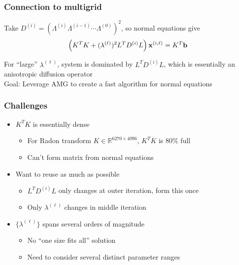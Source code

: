 \documentclass[12pt,t,xcolor=dvipsnames]{beamer}
\renewcommand{\vec}[1]{{\bf #1}}
\renewcommand{\vec}[1]{{\bf #1}}
\begin{document}
\begin{frame}
  \frametitle{Connection to multigrid}

  Take $D^{(i)} =
  \left(\Lambda^{(i)}\Lambda^{(i-1)}\cdots\Lambda^{(0)}\right)^2$, so normal
  equations give
\[
\left(K^TK + (\lambda^{(\ell)})^2L^TD^{(i)}L\right)\vec{x}^{(i,\ell)} = K^T\vec{b}
\]

For ``large'' $\lambda^{(\ell)}$, system is dominated by $L^TD^{(i)}L$,
which is essentially an anisotropic diffusion operator \\[18pt]

\alert{Goal:} Leverage AMG to create a fast algorithm for normal equations

\end{frame}

\begin{frame}
  \frametitle{Challenges}
  \begin{itemize}
  \item $K^TK$ is essentially dense
    \begin{itemize}
    \item For Radon transform $K\in\mathbb{R}^{6270\times4096}$,
      $K^TK$ is 80\% full
      \item Can't form matrix from normal equations
    \end{itemize}
  \item Want to reuse as much as possible
    \begin{itemize}
    \item $L^TD^{(i)}L$ only changes at outer iteration, form this
      once
    \item Only $\lambda^{(\ell)}$ changes in middle iteration
    \end{itemize}
  \item $\{\lambda^{(\ell)}\}$ spans several orders of magnitude
    \begin{itemize}
    \item No ``one size fits all'' solution
    \item Need to consider several distinct parameter ranges
    \end{itemize}
  \end{itemize}

\end{frame}
\end{document}
